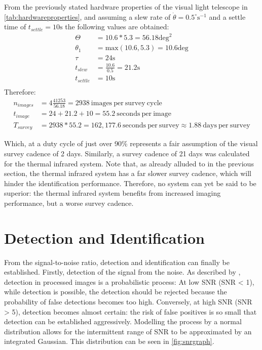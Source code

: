 From the previously stated hardware properties of the visual light telescope in \autoref{tab:hardwareproperties}, and assuming a slew rate of $\dot{\theta} = 0.5^\circ\mathrm{s}^{-1}$ and a settle time of $t_{settle} = 10 \mathrm{s}$ the following values are obtained:
\begin{align}
 \Theta &= 10.6 * 5.3 = 56.18\mathrm{deg}^2 \\
 \theta_1 &= \mathrm{max}(10.6, 5.3) = 10.6 \mathrm{deg} \\
 \tau &= 24 \mathrm{s} \\
 t_{slew} &= \frac{10.6}{0.5} = 21.2 \mathrm{s} \\
 t_{settle} &= 10 \mathrm{s} \\
\end{align}
Therefore:
\begin{align}
 n_{images} &= 4\frac{41253}{56.18} = 2938~\mathrm{images~per~survey~cycle}\\
 t_{image} &= 24 + 21.2 + 10 = 55.2~\mathrm{seconds~per~image}\\
 T_{survey} &= 2938 * 55.2 = 162,177.6~\mathrm{seconds~per~survey} \approx 1.88~\mathrm{days~per~survey}
\end{align}

Which, at a duty cycle of just over 90\% represents a fair assumption of the visual survey cadence of 2 days. Similarly, a survey cadence of 21 days was calculated for the thermal infrared system. Note that, as already alluded to in the previous section, the thermal infrared system has a far slower survey cadence, which will hinder the identification performance. Therefore, no system can yet be said to be superior: the thermal infrared system benefits from increased imaging performance, but a worse survey cadence.

\section{Detection and Identification}
\label{sec:modelling_identification}

From the signal-to-noise ratio, detection and identification can finally be established. Firstly, detection of the signal from the noise. As described by \cite{2017NEOSDT}, detection in processed images is a probabilistic process: At low SNR (SNR < 1), while detection is possible, the detection should be rejected because the probability of false detections becomes too high. Conversely, at high SNR (SNR > 5), detection becomes almost certain: the risk of false positives is so small that detection can be established aggressively. Modelling the process by a normal distribution allows for the intermittent range of SNR to be approximated by an integrated Gaussian. This distribution can be seen in \autoref{fig:snrgraph}. \\

